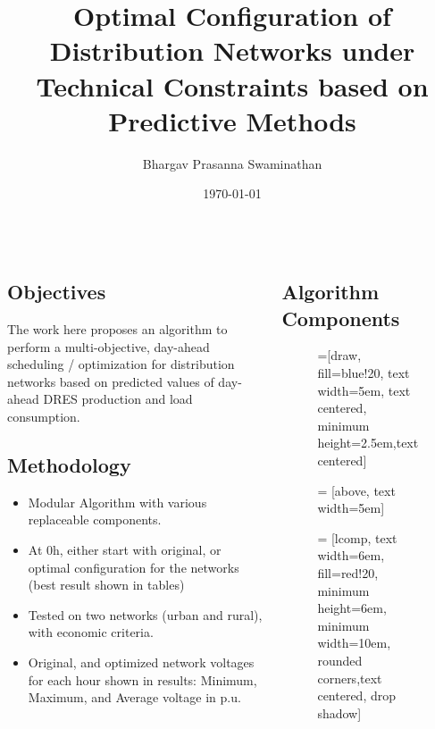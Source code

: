 \documentclass[final]{beamer}
\title
[Stage de M2] %
{ %
Optimal Configuration of Distribution Networks under\\[0.3ex]Technical Constraints based on Predictive Methods
}
\author{ %
Bhargav Prasanna Swaminathan
}
\institute
[Grenoble INP] %
{
M2 - Master in Electrical Engineering for Smart Grids and Buildings\\
Research Domain: Electrical Power Systems - Optimization
}
\date{\today}
\begin{document}
\begin{frame}[t]

\begin{columns}
\begin{column}{0.5\linewidth}

\subsection{Objectives}
The work here proposes an algorithm to perform a multi-objective, day-ahead scheduling / optimization for distribution networks based on predicted values of day-ahead DRES production and load consumption.%

\subsection{Methodology}
\begin{itemize}
\item Modular Algorithm with various replaceable components.
\item At $0$h, either start with original, or optimal configuration for the networks (best result shown in tables)
\item Tested on two networks (urban and rural), with economic criteria.
\item Original, and optimized network voltages for each hour shown in results: Minimum, Maximum, and Average voltage in p.u. 
\end{itemize}
\end{column}%

\begin{column}{0.5\linewidth}
\subsection{Algorithm Components}
\vspace*{-0.5cm}
\begin{figure}[!h]

=[draw, fill=blue!20, text width=5em, 
    text centered, minimum height=2.5em,text centered]

 = [above, text width=5em]

 = [lcomp, text width=6em, fill=red!20, 
    minimum height=6em, minimum width=10em, rounded corners,text centered, drop shadow]


\end{figure}
\end{column}
\end{columns}
\end{frame}
\end{document}
